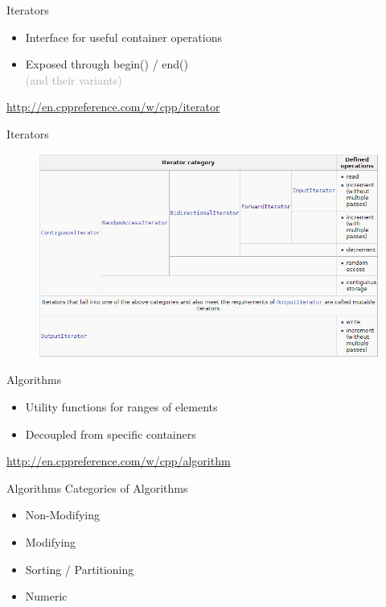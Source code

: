 \documentclass[notes]{beamer}
\begin{document}
\begin{frame}{Iterators}
	\begin{itemize}
		\item Interface for useful container operations
		\item Exposed through begin() / end() \\
			\textcolor{darkgray}{(and their variants)}
	\end{itemize}
	
	\bigskip
	
	\begin{center}
		\url{http://en.cppreference.com/w/cpp/iterator}
	\end{center}
\end{frame}

\begin{frame}{Iterators}
	\begin{figure}
		\centering
		\includegraphics[width=\linewidth]{IteratorTypes}
	\end{figure}
\end{frame}

\begin{frame}{Algorithms}
	\begin{itemize}
		\item Utility functions for ranges of elements
		\item Decoupled from specific containers
	\end{itemize}
	
	\bigskip
	
	\begin{center}
		\url{http://en.cppreference.com/w/cpp/algorithm}
	\end{center}
\end{frame}

\begin{frame}{Algorithms}
	Categories of Algorithms
	\begin{itemize}
		\item Non-Modifying
		\item Modifying
		\item Sorting / Partitioning
		\item Numeric
	\end{itemize}
\end{frame}
\end{document}
